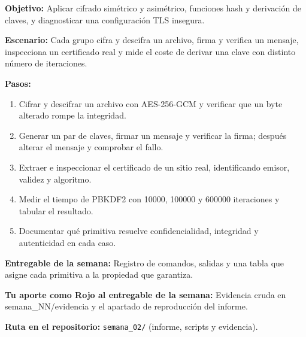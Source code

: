 \documentclass[11pt,a4paper]{article}
\begin{document}
\begin{tcolorbox}[cajaContenido,title={Semana 2 --- Caja de herramientas criptográficas}]
\textbf{Objetivo:} Aplicar cifrado simétrico y asimétrico, funciones hash y derivación de claves, y diagnosticar una configuración TLS insegura.

\textbf{Escenario:} Cada grupo cifra y descifra un archivo, firma y verifica un mensaje, inspecciona un certificado real y mide el coste de derivar una clave con distinto número de iteraciones.


\textbf{Pasos:}
\begin{enumerate}[leftmargin=1.4em,itemsep=2pt,topsep=3pt]
  \item Cifrar y descifrar un archivo con AES-256-GCM y verificar que un byte alterado rompe la integridad.
  \item Generar un par de claves, firmar un mensaje y verificar la firma; después alterar el mensaje y comprobar el fallo.
  \item Extraer e inspeccionar el certificado de un sitio real, identificando emisor, validez y algoritmo.
  \item Medir el tiempo de PBKDF2 con 10000, 100000 y 600000 iteraciones y tabular el resultado.
  \item Documentar qué primitiva resuelve confidencialidad, integridad y autenticidad en cada caso.
\end{enumerate}
\textbf{Entregable de la semana:} Registro de comandos, salidas y una tabla que asigne cada primitiva a la propiedad que garantiza.

\textbf{Tu aporte como Rojo al entregable de la semana:} Evidencia cruda en semana\_NN/evidencia y el apartado de reproducción del informe.

\textbf{Ruta en el repositorio:} \texttt{semana\_02/} (informe, scripts y evidencia).
\end{tcolorbox}
\end{document}
